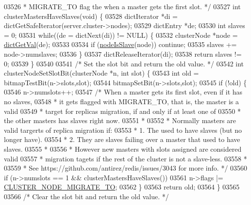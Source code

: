 \begin{DoxyCode}
{{{{{{{{{{{{{{{{{{{{{{{{{{{{{{{{{{{{{{{{{{{{{{{{{{{{{{{{{{{{{03526 \textcolor{comment}{ * MIGRATE\_TO flag the when a master gets the first slot. */}
03527 \textcolor{keywordtype}{int} clusterMastersHaveSlaves(\textcolor{keywordtype}{void}) \{
03528     dictIterator *di = dictGetSafeIterator(server.cluster->nodes);
03529     dictEntry *de;
03530     \textcolor{keywordtype}{int} slaves = 0;
03531     \textcolor{keywordflow}{while}((de = dictNext(di)) != NULL) \{
03532         clusterNode *node = \hyperlink{dict_8h_ae8d2cc391873b2bea2b87c4f80f43120}{dictGetVal}(de);
03533 
03534         \textcolor{keywordflow}{if} (\hyperlink{cluster_8h_a3c99881f6892130c902b42b1f84a0e11}{nodeIsSlave}(node)) \textcolor{keywordflow}{continue};
03535         slaves += node->numslaves;
03536     \}
03537     dictReleaseIterator(di);
03538     \textcolor{keywordflow}{return} slaves != 0;
03539 \}
03540 
03541 \textcolor{comment}{/* Set the slot bit and return the old value. */}
03542 \textcolor{keywordtype}{int} clusterNodeSetSlotBit(clusterNode *n, \textcolor{keywordtype}{int} slot) \{
03543     \textcolor{keywordtype}{int} old = bitmapTestBit(n->slots,slot);
03544     bitmapSetBit(n->slots,slot);
03545     \textcolor{keywordflow}{if} (!old) \{
03546         n->numslots++;
03547         \textcolor{comment}{/* When a master gets its first slot, even if it has no slaves,}
03548 \textcolor{comment}{         * it gets flagged with MIGRATE\_TO, that is, the master is a valid}
03549 \textcolor{comment}{         * target for replicas migration, if and only if at least one of}
03550 \textcolor{comment}{         * the other masters has slaves right now.}
03551 \textcolor{comment}{         *}
03552 \textcolor{comment}{         * Normally masters are valid targerts of replica migration if:}
03553 \textcolor{comment}{         * 1. The used to have slaves (but no longer have).}
03554 \textcolor{comment}{         * 2. They are slaves failing over a master that used to have slaves.}
03555 \textcolor{comment}{         *}
03556 \textcolor{comment}{         * However new masters with slots assigned are considered valid}
03557 \textcolor{comment}{         * migration tagets if the rest of the cluster is not a slave-less.}
03558 \textcolor{comment}{         *}
03559 \textcolor{comment}{         * See https://github.com/antirez/redis/issues/3043 for more info. */}
03560         \textcolor{keywordflow}{if} (n->numslots == 1 && clusterMastersHaveSlaves())
03561             n->flags |= \hyperlink{cluster_8h_a1d5a62356ed9f5986613c2315a358119}{CLUSTER\_NODE\_MIGRATE\_TO};
03562     \}
03563     \textcolor{keywordflow}{return} old;
03564 \}
03565 
03566 \textcolor{comment}{/* Clear the slot bit and return the old value. */}
}}}}}}}}}}}}}}}}}}}}}}}}}}}}}}}}}}}}}}}}}}}}}}}}}}}}}}}}}}}}}
\end{DoxyCode}
